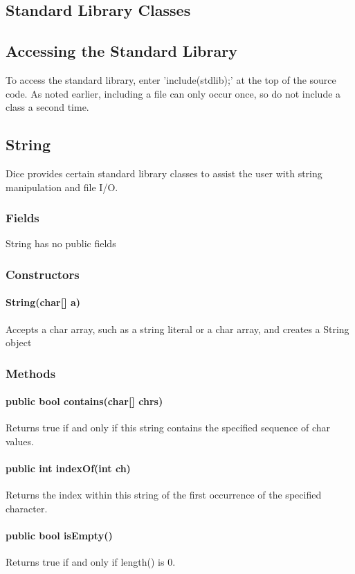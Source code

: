 \begin{homeworkProblem}
	\chapter{Standard Library Classes}
	\section{Accessing the Standard Library}
	To access the standard library, enter 'include(stdlib);' at the top of the source code. As noted earlier, including a file can only occur once, so do not include a class a second time. 
	
	\section{String}
	Dice provides certain standard library classes to assist the user with string manipulation and file I/O.

	\subsection{Fields}
	String has no public fields

	\subsection{Constructors}
	\subsubsection{String(char[] a)}
	Accepts a char array, such as a string literal or a char array, and creates a String object

	\subsection{Methods}
	\subsubsection{public bool contains(char[] chrs)}
	Returns true if and only if this string contains the specified sequence of char values.
	\subsubsection{public int indexOf(int ch)}
	Returns the index within this string of the first occurrence of the specified character.
	\subsubsection{public bool isEmpty()}
	Returns true if and only if length() is 0.

\end{homeworkProblem}
